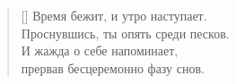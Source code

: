 \documentclass[a5paper,11pt]{memoir}
\begin{document}
\newpage


\color{white}
\begin{verse}[\versewidth]
Время бежит, и утро наступает. \\
Проснувшись, ты опять среди песков. \\
И жажда о себе напоминает, \\
прервав бесцеремонно фазу снов.
\end{verse}
\color{black}
\BgThispage
\end{document}
